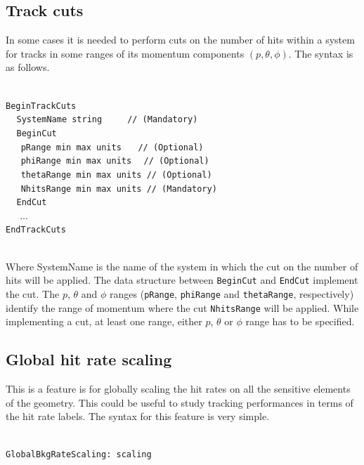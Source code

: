 \subsection{Track cuts}

In some cases it is needed to perform cuts on the number of hits within a system for tracks in some ranges of its momentum components $(p,\theta,\phi)$. 
The syntax is as follows.

~\\
\noindent
{\tt BeginTrackCuts} \\
$~~~~~${\tt SystemName        string        $~~~~~~~$   // (Mandatory)} \\
$~~~~~${\tt BeginCut} \\
$~~~~~~~${\tt pRange           min  max  units  $~~~$   // (Optional)} \\
$~~~~~~~${\tt phiRange         min  max  units    $~$   // (Optional)} \\
$~~~~~~~${\tt thetaRange       min  max  units          // (Optional)} \\
$~~~~~~~${\tt NhitsRange       min  max  units          // (Mandatory)} \\
$~~~~~${\tt EndCut} \\
$~~~~~$ ... \\
{\tt EndTrackCuts}

~\\
\noindent
Where SystemName is the name of the system in which the cut on the number of hits will be applied. The data structure between {\tt BeginCut} and {\tt EndCut} 
implement the cut. The $p$, $\theta$ and $\phi$ ranges ({\tt pRange}, {\tt phiRange} and {\tt thetaRange}, respectively) identify the range of momentum where the 
cut {\tt NhitsRange} will be applied. While implementing a cut, at least one range, either $p$, $\theta$ or $\phi$ range has to be specified.

\subsection{Global hit rate scaling}
\label{subsec:global_bkgrate_scaling}

This is a feature is for globally scaling the hit rates on all the sensitive elements of the geometry. This could be useful to study tracking performances 
in terms of the hit rate labels. The syntax for this feature is very simple.

~\\
\noindent
{\tt GlobalBkgRateScaling:  scaling} \\

